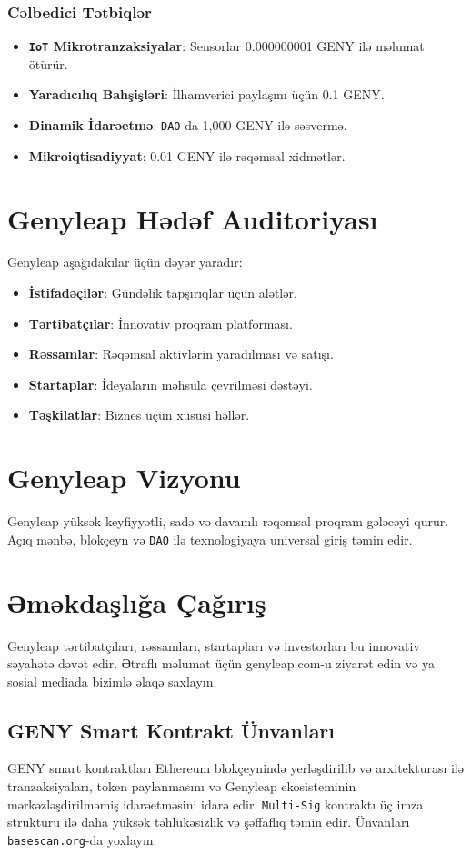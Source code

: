 \documentclass[a4paper,12pt,openany]{book}
\begin{document}
\subsection*{Cəlbedici Tətbiqlər}
\begin{itemize}
    \item \textbf{\texttt{IoT} Mikrotranzaksiyalar}: Sensorlar 0.000000001 GENY ilə məlumat ötürür.
    \item \textbf{Yaradıcılıq Bahşişləri}: İlhamverici paylaşım üçün 0.1 GENY.
    \item \textbf{Dinamik İdarəetmə}: \texttt{DAO}-da 1,000 GENY ilə səsvermə.
    \item \textbf{Mikroiqtisadiyyat}: 0.01 GENY ilə rəqəmsal xidmətlər.
\end{itemize}

\chapter{Genyleap Hədəf Auditoriyası}
Genyleap aşağıdakılar üçün dəyər yaradır:
\begin{itemize}
    \item \textbf{İstifadəçilər}: Gündəlik tapşırıqlar üçün alətlər.
    \item \textbf{Tərtibatçılar}: İnnovativ proqram platforması.
    \item \textbf{Rəssamlar}: Rəqəmsal aktivlərin yaradılması və satışı.
    \item \textbf{Startaplar}: İdeyaların məhsula çevrilməsi dəstəyi.
    \item \textbf{Təşkilatlar}: Biznes üçün xüsusi həllər.
\end{itemize}

\chapter{Genyleap Vizyonu}
Genyleap yüksək keyfiyyətli, sadə və davamlı rəqəmsal proqram gələcəyi qurur. Açıq mənbə, blokçeyn və \texttt{DAO} ilə texnologiyaya universal giriş təmin edir.

\chapter{Əməkdaşlığa Çağırış}
Genyleap tərtibatçıları, rəssamları, startapları və investorları bu innovativ səyahətə dəvət edir. Ətraflı məlumat üçün genyleap.com-u ziyarət edin və ya sosial mediada bizimlə əlaqə saxlayın.

\section*{GENY Smart Kontrakt Ünvanları}
GENY smart kontraktları Ethereum blokçeynində yerləşdirilib və  arxitekturası ilə tranzaksiyaları, token paylanmasını və Genyleap ekosisteminin mərkəzləşdirilməmiş idarəetməsini idarə edir. \texttt{Multi-Sig} kontraktı üç imza strukturu ilə daha yüksək təhlükəsizlik və şəffaflıq təmin edir. Ünvanları \texttt{basescan.org}-da yoxlayın:
\end{document}
